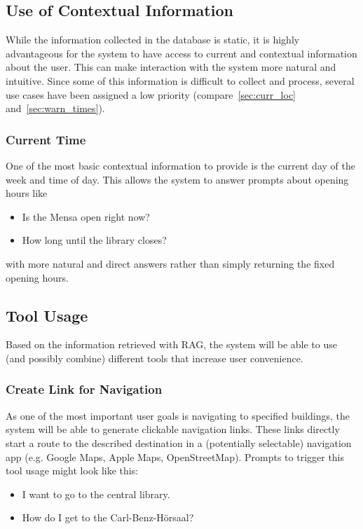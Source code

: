 \documentclass{article}
\begin{document}
\subsection{Use of Contextual Information}
While the information collected in the database is static, it is highly advantageous for the system to have access to current and contextual information about the user. This can make interaction with the system more natural and intuitive. Since some of this information is difficult to collect and process, several use cases have been assigned a low priority (compare~\cref{sec:curr_loc} and~\cref{sec:warn_times}).

\subsubsection{Current Time} \label{sec:curr_time}
One of the most basic contextual information to provide is the current day of the week and time of day. This allows the system to answer prompts about opening hours like
\begin{itemize}
    \item Is the Mensa open right now?
    \item How long until the library closes?
\end{itemize}
with more natural and direct answers rather than simply returning the fixed opening hours.

\subsection{Tool Usage}
Based on the information retrieved with RAG, the system will be able to use (and possibly combine) different tools that increase user convenience.

\subsubsection{Create Link for Navigation} \label{sec:create_nav_link}
As one of the most important user goals is navigating to specified buildings, the system will be able to generate clickable navigation links. These links directly start a route to the described destination in a (potentially selectable) navigation app (e.g. Google Maps, Apple Maps, OpenStreetMap). Prompts to trigger this tool usage might look like this:
  \begin{itemize}
    \item I want to go to the central library.
    \item How do I get to the Carl-Benz-Hörsaal?
  \end{itemize}
\end{document}
